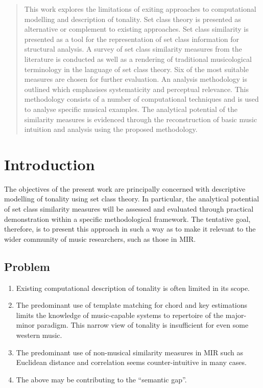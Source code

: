 \documentclass{article}
\begin{document}
\begin{abstract}

This work explores the limitations of exiting approaches to
computational modelling and description of tonality. Set class 
theory is presented as alternative or complement to existing
approaches. Set class similarity is presented as a tool for
the representation of set class information for structural analysis. 
A survey of set class similarity measures from the literature is 
conducted as well as a rendering of traditional musicological terminology in the language 
of set class theory. Six of the most suitable measures are chosen for 
further evaluation. An analysis methodology is outlined which emphasises systematicity 
and perceptual relevance. This methodology consists of a number of computational techniques 
and is used to analyse specific musical examples. The analytical potential of 
the similarity measures is evidenced through the reconstruction of basic 
music intuition and analysis using the proposed methodology.

\end{abstract}

\clearpage
{}

\setcounter{tocdepth}{3}
\tableofcontents
\vspace*{1cm}


\clearpage
\listoftables
\clearpage
\glsaddall
\printglossary[title=Set Class Theory Glossary]
\clearpage
\section{Introduction}
\label{sec-1}

The objectives of the present work are principally concerned with
descriptive modelling of tonality using set class theory. In
particular, the analytical potential of set class similarity measures
will be assessed and evaluated through practical demonstration within
a specific methodological framework. The tentative goal, therefore, is
to present this approach in such a way as to make it relevant to the
wider community of music researchers, such as those in MIR.
\subsection{Problem}
\label{sec-1-1}

\begin{enumerate}
\item Existing computational description of tonality is often limited in
   its scope.
\item The predominant use of template matching for chord and key
   estimations limits the knowledge of music-capable systems to
   repertoire of the major-minor paradigm. This narrow view of
   tonality is insufficient for even some western music.
\item The predominant use of non-musical similarity measures in MIR such
   as Euclidean distance and correlation seems counter-intuitive in
   many cases.
\item The above may be contributing to the ``semantic gap''.
\end{enumerate}
\end{document}
